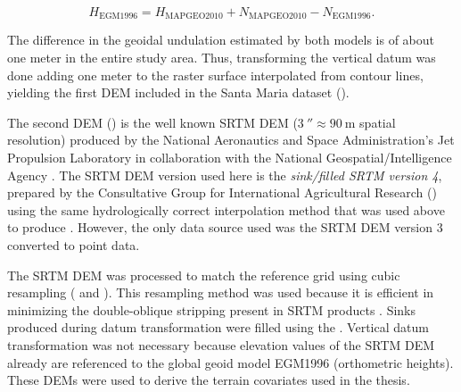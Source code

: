 \begin{equation}
 H_{\text{EGM1996}} = H_{\text{MAPGEO2010}} + N_{\text{MAPGEO2010}} - N_{\text{EGM1996}}.
\end{equation}

\noindent The difference in the geoidal undulation estimated by both models is of about one meter in the 
entire study area. Thus, transforming the vertical datum was done adding one meter to the raster surface 
interpolated from contour lines, yielding the first DEM included in the Santa Maria dataset (\demNew{}).

The second DEM (\demOld{}) is the well known SRTM DEM ($\SI{3}{\arcsecond} \approx \SI{90}{\m}$ spatial 
resolution) produced by the National Aeronautics and Space Administration’s Jet Propulsion Laboratory in 
collaboration with the National Geospatial\-/Intelligence Agency \cite{RodriguezEtAl2006}. The SRTM DEM 
version 
used here is the \emph{sink\-/filled SRTM version \num{4}}, prepared by the Consultative Group for 
International Agricultural Research (\cgiar) using the same hydrologically correct interpolation method that 
was used above to produce \demNew{} \cite{ReuterEtAl2007, JarvisEtAl2008}. However, the only data source used 
was the SRTM DEM version 3 converted to point data.

The SRTM DEM was processed to match the reference grid using cubic resampling ( and 
). This resampling method was used because it is efficient in minimizing the 
double-oblique stripping present in SRTM products \cite{Samuel-RosaEtAl2013c}. Sinks produced during datum 
transformation were filled using the . Vertical datum transformation was not necessary 
because elevation values of the SRTM DEM already are referenced to the global geoid model EGM1996 
(orthometric heights). These DEMs were used to derive the terrain covariates used in the thesis. 

